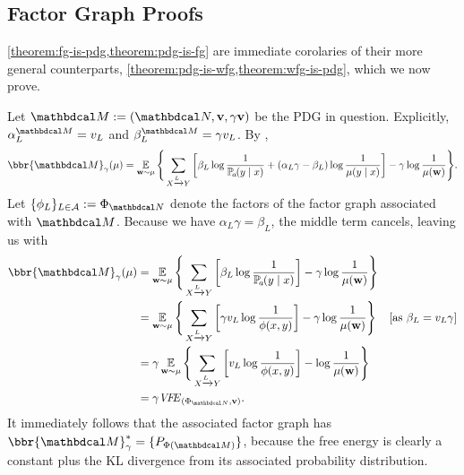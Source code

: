 \begin{subappendices}
\subsection{Factor Graph Proofs}
\cref{theorem:fg-is-pdg,theorem:pdg-is-fg} are immediate corolaries of their
more general counterparts, \cref{theorem:pdg-is-wfg,theorem:wfg-is-pdg}, which
we now prove. 


\begin{lproof}\label{proof:pdg-is-wfg}
	Let $\dg M := (\dg N, \mat v, \gamma \mat v)$ be the PDG in question.
	Explicitly, $\alpha^{\dg M}_L = v_L$ and $\beta_L^{\dg M} =  \gamma v_L$.
	By ,
	\[ \bbr{\dg M}_\gamma(\mu)= \Ex_{\mat w \sim \mu} \Bigg\{   \sum_{ X \xrightarrow{\!\!L} Y  } \left[
		\beta_L \log \frac{1}{\p_a(y\mid x)} + (
			\alpha_L
		\gamma - \beta_L ) \log \frac{1}{\mu(y \mid x)}
					\right] - \gamma \log \frac{1}{\mu(\mat w)}
			\Bigg\}.  \]
	Let $\{\phi_L\}_{L \in \Ar} := \Phi_{\dg N}$ denote the
			factors of the factor graph associated with $\dg M$. 
	Because we have $\alpha_L\gamma  = \beta_L$, the middle term cancels, leaving us with
	\begin{align*}
	\bbr{\dg M}_\gamma(\mu) &= \Ex_{\mat w \sim \mu} \Bigg\{   \sum_{ X \xrightarrow{\!\!L} Y  } \left[
		\beta_L \log \frac{1}{\p_a(y\mid x)} \right] - \gamma \log \frac{1}{\mu(\mat w)} \Bigg\} \\
		&= \Ex_{\mat w \sim \mu} \Bigg\{   \sum_{ X \xrightarrow{\!\!L} Y  } \left[
	\gamma v_L \log \frac{1}{\phi(x,y)}  \right] - \gamma \log \frac{1}{\mu(\mat w)} \Bigg\} 
					&\text{[as $\beta_L = v_L \gamma$]}\\
		&= \gamma \Ex_{\mat w \sim \mu} \Bigg\{   \sum_{ X \xrightarrow{\!\!L} Y  } \left[
v_L \log \frac{1}{\phi(x,y)}
			 \right] -\log \frac{1}{\mu(\mat w)} \Bigg\} \\
			&= \gamma \VFE_{(\FGof{\dg N}, \mat v)}. 
	\end{align*}
	It immediately follows that the associated factor graph has 
	$\bbr{\dg M}^*_\gamma
 	= \{\Pr_{\Phi(\dg M)}\}$, because the free energy is clearly a constant plus the KL divergence from its associated probability distribution.
\end{lproof}


\end{subappendices}
